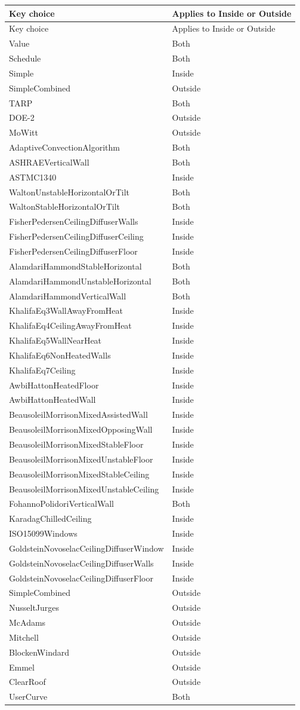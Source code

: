 \begin{longtable}[c]{p{3.49in}p{2.5in}}
\toprule
Key choice & Applies to Inside or Outside \tabularnewline
\midrule
\endfirsthead

\toprule
Key choice & Applies to Inside or Outside \tabularnewline
\midrule
\endhead

Value & Both \tabularnewline
Schedule & Both \tabularnewline
Simple & Inside \tabularnewline
SimpleCombined & Outside \tabularnewline
TARP & Both \tabularnewline
DOE-2 & Outside \tabularnewline
MoWitt & Outside \tabularnewline
AdaptiveConvectionAlgorithm & Both \tabularnewline
ASHRAEVerticalWall~~~ & Both \tabularnewline
ASTMC1340 & Inside \tabularnewline
WaltonUnstableHorizontalOrTilt & Both \tabularnewline
WaltonStableHorizontalOrTilt & Both \tabularnewline
FisherPedersenCeilingDiffuserWalls & Inside \tabularnewline
FisherPedersenCeilingDiffuserCeiling & Inside \tabularnewline
FisherPedersenCeilingDiffuserFloor & Inside \tabularnewline
AlamdariHammondStableHorizontal & Both \tabularnewline
AlamdariHammondUnstableHorizontal & Both \tabularnewline
AlamdariHammondVerticalWall & Both \tabularnewline
KhalifaEq3WallAwayFromHeat & Inside \tabularnewline
KhalifaEq4CeilingAwayFromHeat & Inside \tabularnewline
KhalifaEq5WallNearHeat & Inside \tabularnewline
KhalifaEq6NonHeatedWalls & Inside \tabularnewline
KhalifaEq7Ceiling & Inside \tabularnewline
AwbiHattonHeatedFloor & Inside \tabularnewline
AwbiHattonHeatedWall & Inside \tabularnewline
BeausoleilMorrisonMixedAssistedWall & Inside \tabularnewline
BeausoleilMorrisonMixedOpposingWall & Inside \tabularnewline
BeausoleilMorrisonMixedStableFloor & Inside \tabularnewline
BeausoleilMorrisonMixedUnstableFloor & Inside \tabularnewline
BeausoleilMorrisonMixedStableCeiling & Inside \tabularnewline
BeausoleilMorrisonMixedUnstableCeiling & Inside \tabularnewline
FohannoPolidoriVerticalWall~~~~~~ & Both \tabularnewline
KaradagChilledCeiling & Inside \tabularnewline
ISO15099Windows & Inside \tabularnewline
GoldsteinNovoselacCeilingDiffuserWindow & Inside \tabularnewline
GoldsteinNovoselacCeilingDiffuserWalls & Inside \tabularnewline
GoldsteinNovoselacCeilingDiffuserFloor & Inside \tabularnewline
SimpleCombined~~~~~ & Outside \tabularnewline
NusseltJurges & Outside \tabularnewline
McAdams & Outside \tabularnewline
Mitchell & Outside \tabularnewline
BlockenWindard & Outside \tabularnewline
Emmel & Outside \tabularnewline
ClearRoof & Outside \tabularnewline
UserCurve & Both \tabularnewline
\bottomrule
\end{longtable}

